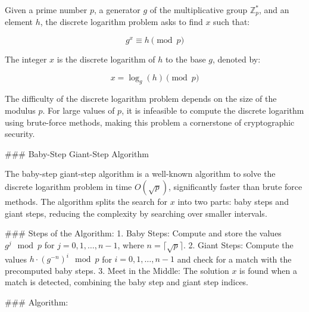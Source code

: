 \documentclass[10pt,a4paper]{article}
\begin{document}
Given a prime number \(p\), a generator \(g\) of the multiplicative group \( \mathbb{Z}_p^* \), and an element \(h\), the discrete logarithm problem asks to find \(x\) such that:

\[
g^x \equiv h \pmod{p}
\]

The integer \(x\) is the discrete logarithm of \(h\) to the base \(g\), denoted by:

\[
x = \log_g(h) \pmod{p}
\]

The difficulty of the discrete logarithm problem depends on the size of the modulus \(p\). For large values of \(p\), it is infeasible to compute the discrete logarithm using brute-force methods, making this problem a cornerstone of cryptographic security.

### Baby-Step Giant-Step Algorithm

The baby-step giant-step algorithm is a well-known algorithm to solve the discrete logarithm problem in time \(O(\sqrt{p})\), significantly faster than brute force methods. The algorithm splits the search for \(x\) into two parts: baby steps and giant steps, reducing the complexity by searching over smaller intervals.

### Steps of the Algorithm:
1. Baby Steps: Compute and store the values \(g^j \mod p\) for \(j = 0, 1, \dots, n-1\), where \(n = \lceil \sqrt{p} \rceil\).
2. Giant Steps: Compute the values \(h \cdot (g^{-n})^i \mod p\) for \(i = 0, 1, \dots, n-1\) and check for a match with the precomputed baby steps.
3. Meet in the Middle: The solution \(x\) is found when a match is detected, combining the baby step and giant step indices.

### Algorithm:
\end{document}
